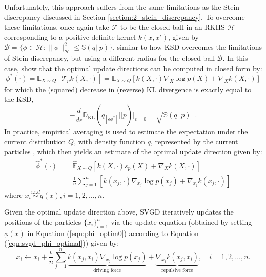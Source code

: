 Unfortunately, this approach suffers from the same limitations as the Stein discrepancy discussed in Section \ref{section:2_stein_discrepancy}. To overcome these limitations, \citet{liu_svgd} once again take $\mathcal{F}$ to be the closed ball in an RKHS $\mathcal{H}$ corresponding to a positive definite kernel $k(x, x')$, given by $\mathcal{B} = \{\phi \in \mathcal{H}: \lVert \phi \rVert_{\mathcal{H}}^2 \le \mathbb{S}(q||p)\}$, similar to how KSD overcomes the limitations of Stein discrepancy, but using a different radius for the closed ball $\mathcal{B}$. In this case, \citet[][Lemma 3.2]{liu_svgd} show that the optimal update directions can be computed in closed form by:
\renewcommand{\theequation}{2.22}
\begin{equation}
\label{eqn:2_22}
\phi^*(\cdot) = \mathbb{E}_{X \sim Q}\left[\mathcal{T}_p k(X, \cdot) \right] = \mathbb{E}_{X \sim Q} \left[k(X, \cdot) \nabla_X \log p(X) + \nabla_X k(X, \cdot)\right]
\end{equation}
for which the (squared) decrease in (reverse) KL divergence is exactly equal to the KSD,
\renewcommand{\theequation}{2.23}
\begin{equation}
- \frac{d}{d \epsilon} \mathbb{D}_{\text{KL}}(q_{[\epsilon \phi^*]} || p)\big|_{\epsilon=0} = \sqrt{\mathbb{S}(q || p)} \enspace.
\end{equation}
In practice, empirical averaging is used to estimate the expectation under the current distribution $Q$, with density function $q$, represented by the current particles \citep{liu_svgd_theory}, which then yields an estimate of the optimal update direction given by:
\begin{align*}
\hat{\phi}^*(\cdot) &=  \mathbb{\hat{E}}_{X \sim Q} \left[k(X, \cdot)s_p(X) + \nabla_X k(X, \cdot)\right]\\
&= \frac{1}{n} \sum_{j=1}^n \left[k(x_j, \cdot) \nabla_{x_j} \log p(x_j) + \nabla_{x_j} k(x_j, \cdot) \right ] \tag{2.24} \label{eqn:svgd_phi_optimal}
\end{align*}
where $x_i \overset{i.i.d}{\sim} q(x), i=1,2,\dots,n$.

Given the optimal update direction above, SVGD iteratively updates the positions of the particles $\{x_i\}_{i=1}^n$ via the update equation (obtained by setting $\phi(x)$ in Equation (\ref{eqn:phi_optim0}) according to Equation (\ref{eqn:svgd_phi_optimal})) given by:
\renewcommand{\theequation}{2.25}
\begin{equation}
\label{eqn:svgd_update}
x_i \leftarrow x_i + \frac{\epsilon}{n} \sum_{j=1}^n \underbrace{k(x_j, x_i) \nabla_{x_j} \log p(x_j)}_{\text{driving force}} + \underbrace{\nabla_{x_j} k(x_j, x_i)}_{\text{repulsive force}},\quad i=1,2,\dots,n.
\end{equation}

